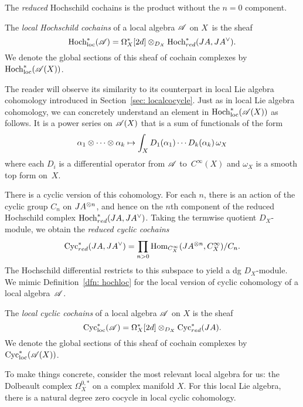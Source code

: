 The {\em reduced} Hochschild cochains is the product without the $n=0$ component. 

\def\Hoch{{\rm Hoch}}
\def\Hochloc{{\rm Hoch}_{\rm loc}}
\def\Cyc{{\rm Cyc}}
\def\Cycloc{{\rm Cyc}_{\rm loc}}

\begin{dfn}\label{dfn: hochloc}
The {\em local Hochschild cochains} of a local algebra $\mathscr A$ on $X$~is the sheaf
\[
\Hochloc^*(\sA) = \Omega^*_X[2d] \tensor_{D_X} \Hoch^*_{red} (JA, JA^\vee) .
\] 
We denote the global sections of this sheaf of cochain complexes by~$\Hochloc^*(\sA(X))$.
\end{dfn}

The reader will observe its similarity to its counterpart in local Lie algebra cohomology introduced in Section~\ref{sec: localcocycle}. 
Just as in local Lie algebra cohomology, we can concretely understand an element in $\Hochloc^*(\sA(X))$ as follows.
It is a power series on $\mathscr A(X)$ that is a sum of functionals of the form
\[
\alpha_1 \otimes \cdots \otimes \alpha_k \mapsto \int_X  D_1(\alpha_1) \cdots D_k(\alpha_k) \, \omega_X
\]
where each $D_i$ is a differential operator from $\mathscr A$ to~$C^\infty(X)$ and $\omega_X$ is a smooth top form on~$X$. 

There is a cyclic version of this cohomology.
For each $n$, there is an action of the cyclic group $C_n$ on $JA^{\otimes n}$,
and hence on the $n$th component of the reduced Hochschild complex $\Hoch_{red}^* (JA, JA^\vee)$.
Taking the termwise quotient $D_X$-module, we obtain the {\em reduced cyclic cochains}
\[
\Cyc_{red}^* (JA, JA^\vee) = \prod_{n > 0} {\rm Hom}_{C^\infty_X} (JA^{\tensor n}, C^\infty_X) / C_n .
\]
The Hochschild differential restricts to this subspace to yield a dg $D_X$-module. 
We mimic Definition~\ref{dfn: hochloc} for the local version of cyclic cohomology of a local algebra~$\mathscr A$. 

\begin{dfn}\label{dfn: cycloc}
The {\em local cyclic cochains} of a local algebra $\mathscr A$ on $X$ is the sheaf
\[
\Cycloc^*(\sA) = \Omega^*_X[2d] \tensor_{D_X} \Cyc^*_{red} (JA) .
\] 
We denote the global sections of this sheaf of cochain complexes by~$\Cycloc^*(\sA(X))$.
\end{dfn}

To make things concrete, 
consider the most relevant local algebra for us: the Dolbeault complex $\Omega^{0,*}_X$ on a complex manifold $X$. 
For this local Lie algebra, there is a natural degree zero cocycle in local cyclic cohomology.

